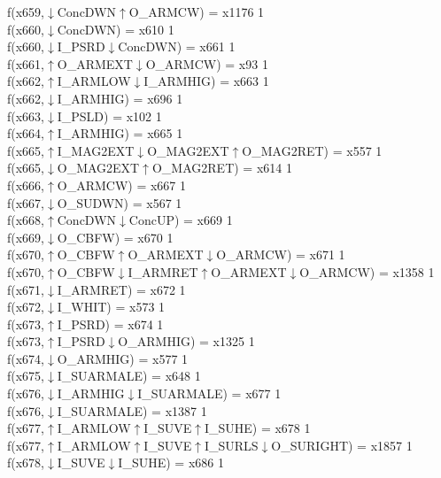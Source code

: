 f(x659,$\downarrow$ConcDWN$\uparrow$O\_ARMCW) = x1176 {1} \\
f(x660,$\downarrow$ConcDWN) = x610 {1} \\
f(x660,$\downarrow$I\_PSRD$\downarrow$ConcDWN) = x661 {1} \\
f(x661,$\uparrow$O\_ARMEXT$\downarrow$O\_ARMCW) = x93 {1} \\
f(x662,$\uparrow$I\_ARMLOW$\downarrow$I\_ARMHIG) = x663 {1} \\
f(x662,$\downarrow$I\_ARMHIG) = x696 {1} \\
f(x663,$\downarrow$I\_PSLD) = x102 {1} \\
f(x664,$\uparrow$I\_ARMHIG) = x665 {1} \\
f(x665,$\uparrow$I\_MAG2EXT$\downarrow$O\_MAG2EXT$\uparrow$O\_MAG2RET) = x557 {1} \\
f(x665,$\downarrow$O\_MAG2EXT$\uparrow$O\_MAG2RET) = x614 {1} \\
f(x666,$\uparrow$O\_ARMCW) = x667 {1} \\
f(x667,$\downarrow$O\_SUDWN) = x567 {1} \\
f(x668,$\uparrow$ConcDWN$\downarrow$ConcUP) = x669 {1} \\
f(x669,$\downarrow$O\_CBFW) = x670 {1} \\
f(x670,$\uparrow$O\_CBFW$\uparrow$O\_ARMEXT$\downarrow$O\_ARMCW) = x671 {1} \\
f(x670,$\uparrow$O\_CBFW$\downarrow$I\_ARMRET$\uparrow$O\_ARMEXT$\downarrow$O\_ARMCW) = x1358 {1} \\
f(x671,$\downarrow$I\_ARMRET) = x672 {1} \\
f(x672,$\downarrow$I\_WHIT) = x573 {1} \\
f(x673,$\uparrow$I\_PSRD) = x674 {1} \\
f(x673,$\uparrow$I\_PSRD$\downarrow$O\_ARMHIG) = x1325 {1} \\
f(x674,$\downarrow$O\_ARMHIG) = x577 {1} \\
f(x675,$\downarrow$I\_SUARMALE) = x648 {1} \\
f(x676,$\downarrow$I\_ARMHIG$\downarrow$I\_SUARMALE) = x677 {1} \\
f(x676,$\downarrow$I\_SUARMALE) = x1387 {1} \\
f(x677,$\uparrow$I\_ARMLOW$\uparrow$I\_SUVE$\uparrow$I\_SUHE) = x678 {1} \\
f(x677,$\uparrow$I\_ARMLOW$\uparrow$I\_SUVE$\uparrow$I\_SURLS$\downarrow$O\_SURIGHT) = x1857 {1} \\
f(x678,$\downarrow$I\_SUVE$\downarrow$I\_SUHE) = x686 {1} \\
